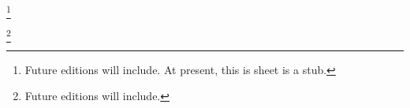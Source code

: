 
\footnote{Future editions will include. At present, this is sheet is a stub.}

\footnote{Future editions will include.}



\blankpage

